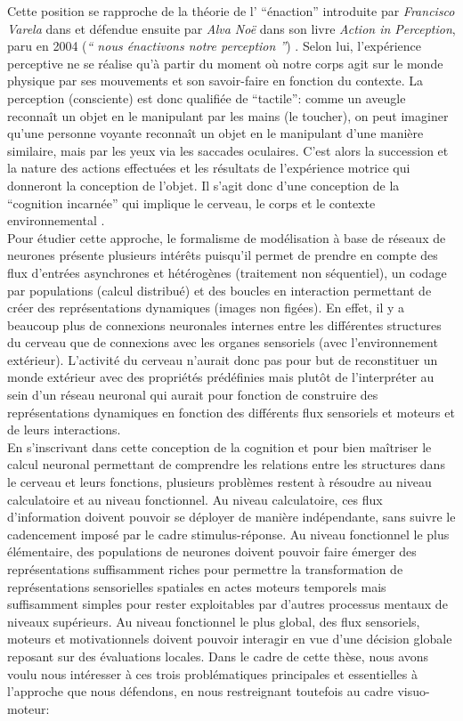 Cette position se rapproche de la théorie de l' ``énaction'' introduite par \textit{Francisco Varela} dans \cite{Maturana:1987} et défendue ensuite par \textit{Alva Noë} dans son livre \textit{Action in Perception}, paru en 2004  (\textit{`` nous énactivons notre perception ''}) \cite{Noe:2004}. Selon lui, l'expérience perceptive ne se réalise qu'à partir du moment o\`u notre corps agit sur le monde physique par ses mouvements et son savoir-faire en fonction du contexte. La perception (consciente) est donc qualifiée de ``tactile'': comme un aveugle reconnaît un objet en le manipulant par les mains (le toucher), on peut imaginer qu'une personne voyante reconnaît un objet en le manipulant d'une manière similaire, mais par les yeux via les saccades oculaires. C'est alors la succession et la nature des actions effectuées et les résultats de l'expérience motrice qui donneront la conception de l'objet. Il s'agit donc d'une conception de la ``cognition incarnée'' qui implique le cerveau, le corps et le contexte environnemental \cite{Noe:2004,Regan:2001}.\\

Pour étudier cette approche, le formalisme de modélisation à base de réseaux de neurones présente plusieurs intérêts puisqu'il permet de prendre en compte des flux d'entrées asynchrones et hétérogènes (traitement non séquentiel), un codage par populations (calcul distribué) et des boucles en interaction permettant de créer des représentations dynamiques (images non figées). En effet, il y a beaucoup plus de connexions neuronales internes entre les différentes structures du cerveau que de connexions avec les organes sensoriels (avec l'environnement extérieur). L'activité du cerveau n'aurait donc pas pour but de reconstituer un monde extérieur avec des propriétés prédéfinies mais plutôt de l'interpréter au sein d'un réseau neuronal \cite{Varela:1993} qui aurait pour fonction de construire des représentations dynamiques en fonction des différents flux sensoriels et moteurs et de leurs interactions.\\ 

En s'inscrivant dans cette conception de la cognition et pour bien maîtriser le calcul neuronal permettant de comprendre les relations entre les structures dans le cerveau et leurs fonctions, plusieurs problèmes restent à résoudre au niveau calculatoire et au niveau fonctionnel. Au niveau calculatoire, ces flux d'information doivent pouvoir se déployer de manière indépendante, sans suivre le cadencement imposé par le cadre stimulus-réponse. Au niveau fonctionnel le plus élémentaire, des populations de neurones doivent pouvoir faire émerger des représentations suffisamment riches pour permettre la transformation de représentations sensorielles spatiales en actes moteurs temporels mais suffisamment simples pour rester exploitables par d'autres processus mentaux de niveaux supérieurs. Au niveau fonctionnel le plus global, des flux sensoriels, moteurs et motivationnels doivent pouvoir interagir en vue d'une décision globale reposant sur des évaluations locales. Dans le cadre de cette thèse, nous avons voulu nous intéresser à ces trois problématiques principales et essentielles à l'approche que nous défendons, en nous restreignant toutefois au cadre visuo-moteur:\\

